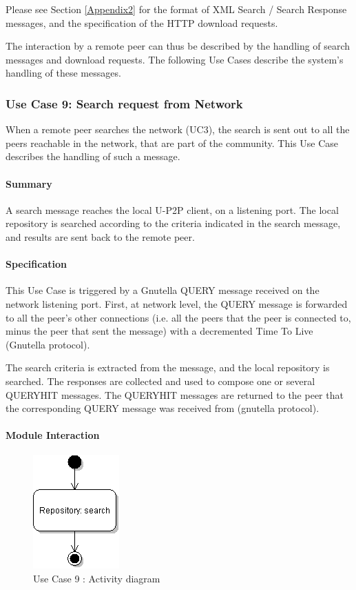 \documentclass[titlepage]{article}%
\begin{document}
Please see Section \ref{Appendix2} for the format of XML Search / Search Response messages, and the specification of the HTTP download requests.

The interaction by a remote peer can thus be described by the handling of search messages and download requests. The following Use Cases describe the system's handling of these messages.
\subsubsection{Use Case 9: Search request from Network} 
 When a remote peer searches the network (UC3), the search is sent out to all the peers reachable in the network, that are part of the community. This Use Case describes the handling of such a message. 

\paragraph{Summary}
A search message reaches the local U-P2P client, on a listening port. The local repository is searched according to the criteria indicated in the search message, and results are sent back to the remote peer.  

\paragraph{Specification}

This Use Case is triggered by a Gnutella QUERY message received on the network listening port. 
First, at network level, the QUERY message is forwarded to all the peer's other connections (i.e. all the peers that the peer is connected to, minus the peer that sent the message) with a decremented Time To Live (Gnutella protocol).

The search criteria is extracted from the message, and the local repository is searched. The responses are collected and used to compose one or several QUERYHIT messages. The QUERYHIT messages are returned to the peer that the corresponding QUERY message was received from (gnutella protocol).

\paragraph{Module Interaction}

\begin{figure}[htb]
\centering
	\includegraphics[scale=0.5]{diagrams/uc9-searchfromnetwork.png}
	\caption{Use Case 9 : Activity diagram}
	\label{fig:uc9}
\end{figure}
 
\end{document}
